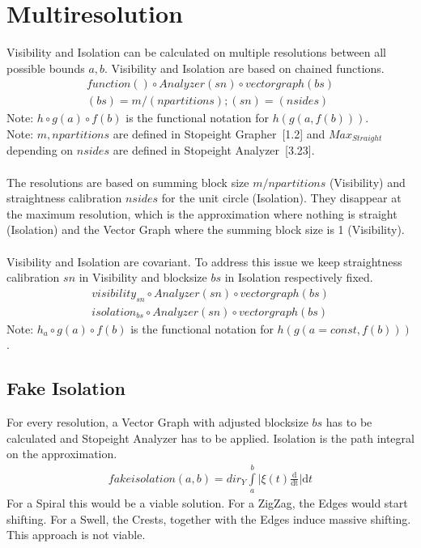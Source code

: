 \documentclass{report}
\begin{document}
\chapter{Multiresolution}
Visibility and Isolation can be calculated on multiple resolutions between all possible bounds $a,b$.
Visibility and Isolation are based on chained functions.
\begin{align*}
function() \circ Analyzer(sn) \circ vectorgraph(bs)\\
(bs)=m/(npartitions);(sn)=(nsides)
\end{align*}
Note: $h \circ g(a) \circ f(b)$ is the functional notation for $h(g(a,f(b)))$.\\
Note: $m,npartitions$ are defined in Stopeight Grapher~\cite{Grapher}[1.2] and $Max_{Straight}$ depending on $nsides$ are defined in Stopeight Analyzer~\cite{Analyzer}[3.23].\\\\
The resolutions are based on summing block size $m/npartitions$ (Visibility) and straightness calibration $nsides$ for the unit circle (Isolation). They disappear at the maximum resolution, which is the approximation where nothing is straight (Isolation) and the Vector Graph where the summing block size is 1 (Visibility).\\\\
Visibility and Isolation are covariant. To address this issue we keep straightness calibration $sn$ in Visibility and blocksize $bs$ in Isolation respectively fixed.
\begin{align}
visibility_{sn} \circ Analyzer(sn) \circ vectorgraph(bs)\\
isolation_{bs} \circ Analyzer(sn) \circ vectorgraph(bs)
\end{align}
Note: $h_{a} \circ g(a) \circ f(b)$ is the functional notation for $h(g(a=const,f(b)))$.

\section{Fake Isolation}
For every resolution, a Vector Graph with adjusted blocksize $bs$ has to be calculated and Stopeight Analyzer has to be applied.
Isolation is the path integral on the approximation.
\begin{align}
fakeisolation(a,b)= dir_{Y} \int \limits _{a}^{b} \lvert \xi(t)\frac{\mathrm{d}}{\mathrm{dt}} \rvert \mathrm{d}t
\end{align}
For a Spiral this would be a viable solution.
For a ZigZag, the Edges would start shifting.
For a Swell, the Crests, together with the Edges induce massive shifting.
This approach is not viable.
\end{document}
